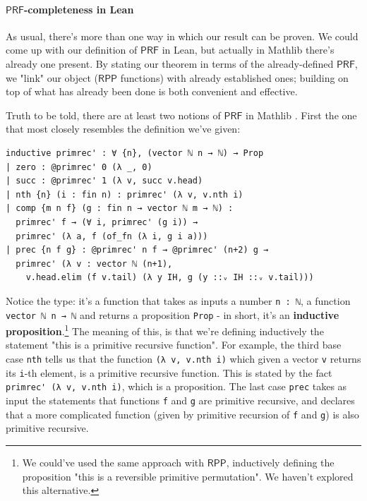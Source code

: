 \documentclass[oneside]{book}
\theoremstyle{definition}
\theoremstyle{remark}
\theoremstyle{plain}
\newcommand{\RPP}{\mathsf{RPP}}
\newcommand{\PRF}{\mathsf{PRF}}
\begin{document}
\paragraph{$\PRF$-completeness in Lean}

As usual, there's more than one way in which our result can be proven.
We could come up with our definition of $\PRF$ in Lean,
but actually in Mathlib there's already one present.
By stating our theorem in terms of the already-defined $\PRF$,
we "link" our object ($\RPP$ functions) with already established ones;
building on top of what has already been done is both convenient and effective.

Truth to be told, there are at least two notions of $\PRF$ in Mathlib \cite{Carneiro19}.
First the one that most closely resembles the definition we've given:
\begin{lstlisting}
inductive primrec' : ∀ {n}, (vector ℕ n → ℕ) → Prop
| zero : @primrec' 0 (λ _, 0)
| succ : @primrec' 1 (λ v, succ v.head)
| nth {n} (i : fin n) : primrec' (λ v, v.nth i)
| comp {m n f} (g : fin n → vector ℕ m → ℕ) :
  primrec' f → (∀ i, primrec' (g i)) →
  primrec' (λ a, f (of_fn (λ i, g i a)))
| prec {n f g} : @primrec' n f → @primrec' (n+2) g →
  primrec' (λ v : vector ℕ (n+1),
    v.head.elim (f v.tail) (λ y IH, g (y ::ᵥ IH ::ᵥ v.tail)))
\end{lstlisting}
Notice the type: it's a function that takes as inputs a number \lstinline{n : ℕ},
a function \lstinline{vector ℕ n → ℕ} and returns a proposition \lstinline{Prop} -
in short, it's an \textbf{inductive proposition}.\footnote{We could've used the same approach with $\RPP$, inductively defining the proposition
"this is a reversible primitive permutation". We haven't explored this alternative.}
The meaning of this, is that we're defining inductively the statement "this is a primitive recursive function".
For example, the third base case \lstinline{nth} tells us that the function \lstinline{(λ v, v.nth i)}
which given a vector \lstinline{v} returns its \lstinline{i}-th element, is a primitive recursive function.
This is stated by the fact \lstinline{primrec' (λ v, v.nth i)}, which is a proposition.
The last case \lstinline{prec} takes as input the statements that functions \lstinline{f} and \lstinline{g} are primitive recursive,
and declares that a more complicated function (given by primitive recursion of \lstinline{f} and \lstinline{g}) is also primitive recursive.
\end{document}
